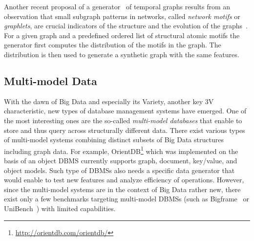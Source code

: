 Another recent proposal of a generator~\cite{mlg2018_42} of temporal graphs results from an observation that small subgraph patterns in networks, called \emph{network motifs} or \emph{graphlets}, are crucial indicators of the structure and the evolution of the graphs~\cite{Paranjape:2017:MTN:3018661.3018731}. For a given graph and a predefined ordered list of structural atomic motifs the generator first computes the distribution of the motifs in the graph. The distribution is then used to generate a synthetic graph with the same features.




\subsection{Multi-model Data}
With the dawn of Big Data and especially its Variety, another key 3V characteristic, new types of
database management systems have emerged. One of the most interesting ones
are the so-called \emph{multi-model databases} that enable to store and
thus query across structurally different data. There exist various types of
multi-model systems combining  distinct subsets of Big Data structures including graph data.
For example, OrientDB\footnote{\url{http://orientdb.com/orientdb/}} which was
implemented on the basis of an object DBMS currently supports graph, document,
key/value, and object models. Such type of DBMSs also needs a specific
data generator that would enable
to test new features and analyze efficiency of operations. However, since the
multi-model systems are in the context of Big Data rather new, there exist only
a few benchmarks targeting multi-model DBMSs (such as
Bigframe~\cite{journals/pvldb/KunjirKB14} or UniBench~\cite{conf/cidr/lu17})
with limited capabilities.


